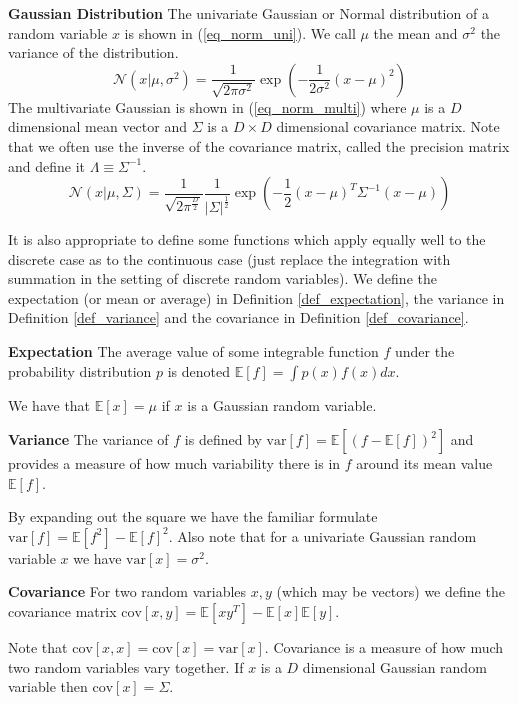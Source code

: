 \documentclass[../masters.tex]{subfiles}
\begin{document}
\begin{defn}
\textbf{Gaussian Distribution} The univariate Gaussian or Normal distribution of a random variable $x$ is shown in (\ref{eq_norm_uni}). We call $\mu$ the mean and $\sigma^2$ the variance of the distribution.
\begin{equation}
\mathcal{N}(x|\mu, \sigma^2) = \frac{1}{\sqrt{2\pi\sigma^2}}\exp\left(-\frac{1}{2\sigma^2}(x-\mu)^2\right)
\label{eq_norm_uni}
\end{equation}
The multivariate Gaussian is shown in (\ref{eq_norm_multi}) where $\mu$ is a $D$ dimensional mean vector and $\Sigma$ is a $D \times D$ dimensional covariance matrix. Note that we often use the inverse of the covariance matrix, called the precision matrix and define it $\Lambda \equiv \Sigma^{-1}$.
\begin{equation}
\mathcal{N}(x|\mu, \Sigma) = \frac{1}{\sqrt{2\pi^{\frac{D}{2}}}}\frac{1}{|\Sigma|^{\frac{1}{2}}}\exp\left(-\frac{1}{2}(x-\mu)^T\Sigma^{-1}(x-\mu)\right)
\label{eq_norm_multi}
\end{equation}
\end{defn}
It is also appropriate to define some functions which apply equally well to the discrete case as to the continuous case (just replace the integration with summation in the setting of discrete random variables). We define the expectation (or mean or average) in Definition \ref{def_expectation}, the variance in Definition \ref{def_variance} and the covariance in Definition \ref{def_covariance}. 
\begin{defn}
\textbf{Expectation} The average value of some integrable function $f$ under the probability distribution $p$ is denoted $\mathbb{E}[f] = \int p(x)f(x)dx$.
\label{def_expectation}
\end{defn}
We have that $\mathbb{E}[x]=\mu$ if $x$ is a Gaussian random variable.
\begin{defn}
\textbf{Variance} The variance of $f$ is defined by $\text{var}[f] = \mathbb{E}[(f - \mathbb{E}[f])^2]$ and provides a measure of how much variability there is in $f$ around its mean value $\mathbb{E}[f]$.
\label{def_variance}
\end{defn}
By expanding out the square we have the familiar formulate $\text{var}[f] = \mathbb{E}[f^2] - \mathbb{E}[f]^2$. Also note that for a  univariate Gaussian random variable $x$ we have $\text{var}[x] =\sigma^2$.
\begin{defn}
\textbf{Covariance} For two random variables $x,y$ (which may be vectors) we define the covariance matrix $\text{cov}[x,y] = \mathbb{E}[xy^T] - \mathbb{E}[x]\mathbb{E}[y]$.
\label{def_covariance}
\end{defn}
Note that $\text{cov}[x,x]=\text{cov}[x]=\text{var}[x]$. Covariance is a measure of how much two random variables vary together. If $x$ is a $D$ dimensional Gaussian random variable then $\text{cov}[x] = \Sigma$.  
\end{document}
